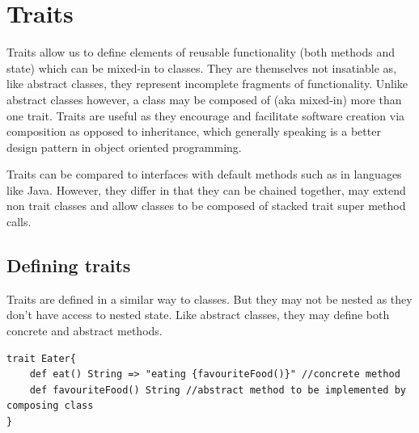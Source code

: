 \documentclass[conc-doc]{subfiles}
\begin{document}
	
	\chapter[Traits]{Traits}


Traits allow us to define elements of reusable functionality (both methods and state) which can be mixed-in to classes. They are themselves not insatiable as, like abstract classes, they represent incomplete fragments of functionality. Unlike abstract classes however, a class may be composed of (aka mixed-in) more than one trait. Traits are useful as they encourage and facilitate software creation via composition as opposed to inheritance, which generally speaking is a better design pattern in object oriented programming.

Traits can be compared to interfaces with default methods such as in languages like Java. However, they differ in that they can be chained together, may extend non trait classes and allow classes to be composed of stacked trait super method calls.

\section{Defining traits}
Traits are defined in a similar way to classes. But they may not be nested as they don't have access to nested state. Like abstract classes, they may define both concrete and abstract methods.
\begin{lstlisting}
trait Eater{
	def eat() String => "eating {favouriteFood()}" //concrete method
	def favouriteFood() String //abstract method to be implemented by composing class
}
\end{lstlisting}
\end{document}
